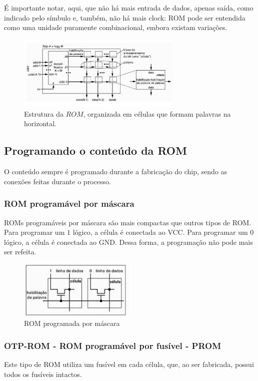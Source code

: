 \documentclass{article}
\begin{document}
É importante notar, aqui, que não há mais entrada de dados, apenas saída, como indicado pelo símbulo e, também, não há mais clock: ROM pode ser entendida como uma unidade puramente combinacional, embora existam variações.

\begin{figure}[h!] 
    \centering 
    \includegraphics[width=0.7\textwidth]{estruturaRom.jpg}
    \caption{Estrutura da $ROM$, organizada em células que formam palavras na horizontal.} 
    \label{fig:estruturaRom} 
\end{figure}

 \newpage
\subsection{Programando o conteúdo da ROM}
O conteúdo sempre é programado durante a fabricação do chip, sendo as conexões feitas durante o processo.

\subsubsection{ROM programável por máscara}
ROMs programáveis por máscara são mais compactas que outros tipos de ROM. Para programar um $1$ lógico, a célula é conectada ao VCC. Para programar um $0$ lógico, a célula é conectada ao GND. Dessa forma, a programação não pode mais ser refeita.

\begin{figure}[h!] 
    \centering 
    \includegraphics[width=0.5\textwidth]{programacaoRomMascara.jpg}
    \caption{ROM programada por máscara} 
    \label{fig:mascaraRom} 
\end{figure}

\newpage
\subsubsection{OTP-ROM - ROM programável por fusível - PROM}
Este tipo de ROM utiliza um fusível em cada célula, que, ao ser fabricada, possui todos os fusíveis intactos.
\end{document}
